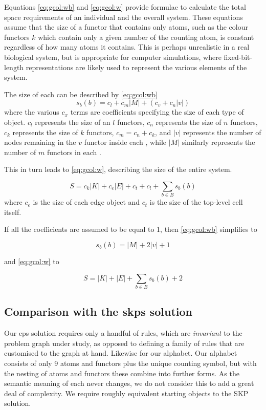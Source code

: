 Equations \eqref{eq:gcol:wb} and \eqref{eq:gcol:w} provide formulae to calculate the total space requirements of an individual \bo{} and the overall system. These equations assume that the size of a functor that contains only atoms, such as the colour functors \(k\) which contain only a given number of the counting atom, is constant regardless of how many atoms it contains.  This is perhaps unrealistic in a real biological system, but is appropriate for computer simulations, where fixed-bit-length representations are likely used to represent the various elements of the system.

The size of each \bo{} can be described by \eqref{eq:gcol:wb}
\begin{equation}\label{eq:gcol:wb}
    s_b(b) = c_l + c_m |M| + (c_v + c_n |v|)
\end{equation} where the various \(c_x\) terms are coefficients specifying the size of each type of object.  \(c_l\) represents the size of an \(l\) functors, \(c_n\) represents the size of \(n\) functors, \(c_k\) represents the size of \(k\) functors, \(c_m = c_n + c_k\), and \(|v|\) represents the number of nodes remaining in the \(v\) functor inside each \bo{}, while \(|M|\) similarly represents the number of \(m\) functors in each \bo{}.

This in turn leads to \eqref{eq:gcol:w}, describing the size of the entire system.

\begin{equation}\label{eq:gcol:w}
    S = c_k |K| + c_e |E| + c_t + c_l + \sum_{b \in B}s_b(b)
\end{equation} where \(c_e\) is the size of each edge object and \(c_t\) is the size of the top-level cell itself.

If all the coefficients are assumed to be equal to 1, then \eqref{eq:gcol:wb} simplifies to 

\begin{equation}
    s_b(b) = |M| + 2 |v| + 1
\end{equation}

and \eqref{eq:gcol:w} to

\begin{equation}
    S = |K| + |E| + \sum_{b \in B}s_b(b) + 2
\end{equation}

\subsection{Comparison with the \texorpdfstring{\acrlong{skps}}{Simple Kernel P systems} solution}
Our \gls{cps} solution requires only a handful of rules, which are \emph{invariant} to the problem graph under study, as opposed to defining a family of rules that are customised to the graph at hand.  Likewise for our alphabet.  Our alphabet consists of only 9 atoms and functors plus the unique counting symbol, but with the nesting of atoms and functors these combine into further forms.  As the semantic meaning of each never changes, we do not consider this to add a great deal of complexity.  We require roughly equivalent starting objects to the SKP solution.

